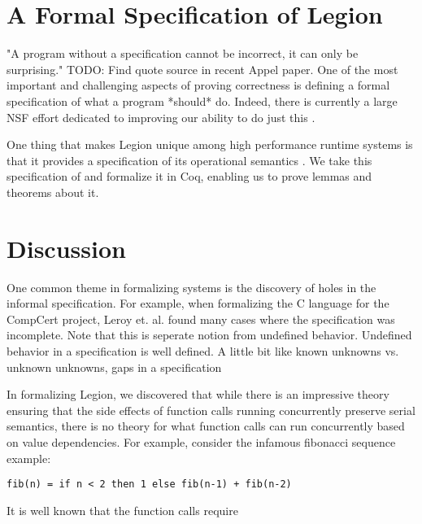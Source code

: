 \section{A Formal Specification of Legion}

"A program without a specification cannot be incorrect, it can only be
surprising." TODO: Find quote source in recent Appel paper. One of the most
important and challenging aspects of proving correctness is defining a formal
specification of what a program *should* do. Indeed, there is currently a large
NSF effort dedicated to improving our ability to do just this \cite{deepspec}. 

One thing that makes Legion unique among high performance runtime systems is
that it provides a specification of its operational semantics \cite{oopsla13}.
We take this specification of and formalize it in Coq, enabling us to prove
lemmas and theorems about it.

\section{Discussion}

One common theme in formalizing systems is the discovery of holes in the
informal specification. For example, when formalizing the C language for the
CompCert project, Leroy et. al. found many cases where the specification was
incomplete. Note that this is seperate notion from undefined behavior. Undefined
behavior in a specification is well defined. A little bit like known unknowns
vs. unknown unknowns, gaps in a specification  

In formalizing Legion, we discovered that while there is an impressive theory
ensuring that the side effects of function calls running concurrently preserve
serial semantics, there is no theory for what function calls can run
concurrently based on value dependencies. For example, consider the infamous
fibonacci sequence example: 

\begin{lstlisting}
fib(n) = if n < 2 then 1 else fib(n-1) + fib(n-2)
\end{lstlisting}
 
It is well known that the function calls require   
